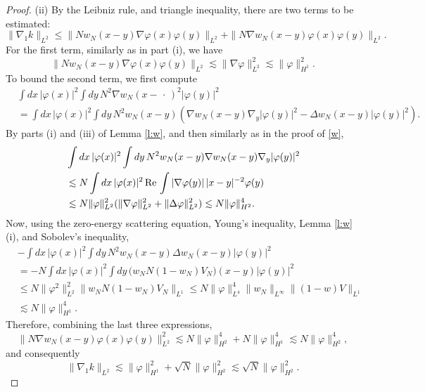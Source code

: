 \documentclass[a4paper,11pt]{article}
\renewcommand{\Re}{\,{\rm Re}\,}
\begin{document}
\begin{proof}
  (ii) By the Leibniz rule, and triangle inequality, there are two terms to be
  estimated:
  \begin{displaymath}
    \| \nabla_1 k \|_{L^2} \le \| N w_N(x-y) \nabla \varphi(x) \varphi(y)
    \|_{L^2} + \| N \nabla w_N(x-y) \varphi(x) \varphi(y) \|_{L^2}.
  \end{displaymath}
  For the first term, similarly as in part (i), we have
  \begin{displaymath}
    \| N w_N(x-y) \nabla \varphi(x) \varphi(y) \|_{L^2} \apprle \| \nabla
    \varphi \|_{L^2}^2 \apprle \| \varphi \|_{H^1}^2.
  \end{displaymath}
  To bound the second term, we first compute
  \begin{align*}
    & \int dx \, |\varphi(x)|^2 \int dy \, N^2 \nabla w_N(x-\,\cdot\,)^2
    |\varphi(y)|^2 \\
    & = \int dx \, |\varphi(x)|^2 \int dy \, N^2 w_N(x-y) ( \nabla w_N(x-y)
    \nabla_y |\varphi(y)|^2 - \Delta w_N(x-y) |\varphi(y)|^2 ).
  \end{align*}
  By parts (i) and (iii) of Lemma \ref{l:w}, and then similarly as in the
  proof of \eqref{w},
  \begin{align*}
    & \int dx \, |\varphi(x)|^2 \int dy \, N^2 w_N(x-y) \nabla w_N(x-y)
    \nabla_y |\varphi(y)|^2 \\
    & \apprle N \int dx \, |\varphi(x)|^2 \Re \int |\nabla \varphi(y)| \,
    |x-y|^{-2} \varphi(y) \\
    & \apprle N \| \varphi \|_{L^2}^2 ( \| \nabla \varphi \|_{L^2}^2 + \|
    \Delta \varphi \|_{L^2}^2) \apprle N \| \varphi \|_{H^2}^4.
  \end{align*}
  Now, using the zero-energy scattering equation, Young's inequality, Lemma
  \ref{l:w}(i), and Sobolev's inequality,
  \begin{align*}
    & - \int dx \, |\varphi(x)|^2 \int dy \, N^2 w_N(x-y) \Delta w_N(x-y)
    |\varphi(y)|^2 \\
    & = - N \int dx \, |\varphi(x)|^2 \int dy \, \big( w_N N (1-w_N) V_N
    \big)(x-y) |\varphi(y)|^2 \\
    & \le N \| \varphi^2 \|_{L^2}^2 \| w_N N (1-w_N) V_N \|_{L^1} \le N \|
    \varphi \|_{L^4}^4 \| w_N \|_{L^\infty} \| (1-w)V \|_{L^1} \\
    & \apprle N \| \varphi \|_{H^1}^4.
  \end{align*}
  Therefore, combining the last three expressions,
  \begin{displaymath}
    \| N \nabla w_N(x-y) \varphi(x) \varphi(y) \|_{L^2}^2 \apprle N \| \varphi
    \|_{H^2}^4 + N \| \varphi \|_{H^1}^4 \apprle N \| \varphi \|_{H^2}^4,
  \end{displaymath}
  and consequently
  \begin{displaymath}
    \| \nabla_1 k \|_{L^2} \apprle \| \varphi \|_{H^1}^2 + \sqrt{N} \| \varphi
    \|_{H^2}^2 \apprle \sqrt{N} \| \varphi \|_{H^2}^2.
  \end{displaymath}



\end{proof}
\end{document}
